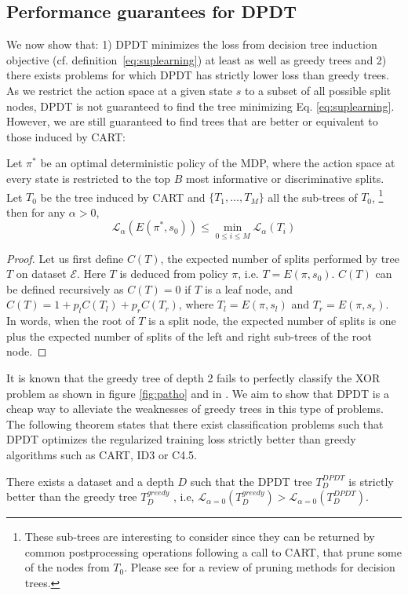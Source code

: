 \subsection{Performance guarantees for DPDT}
We now show that: 1) DPDT minimizes the loss from decision tree induction objective (cf. definition~\ref{eq:suplearning}) at least as well as greedy trees and 2) there exists problems for which DPDT has strictly lower loss than greedy trees. 
As we restrict the action space at a given state $s$ to a subset of all possible split nodes, DPDT is not guaranteed to find the tree minimizing Eq. \ref{eq:suplearning}. However, we are still guaranteed to find trees that are better or equivalent to those induced by CART:
\begin{theorem}\label{prop:cart}
Let $\pi^*$ be an optimal deterministic policy of the MDP, where the action space at every state is restricted to the top $B$ most informative or discriminative splits. 
Let $T_0$ be the tree induced by CART and $\{T_1,\dots,T_M\}$ all the sub-trees of $T_0$, \footnote{These sub-trees are interesting to consider since they can be returned by common postprocessing operations following a call to CART, that prune some of the nodes from $T_0$. Please see \cite{pruning1} for a review of pruning methods for decision trees.} then for any $\alpha > 0$, 
\[
{\mathcal L}_\alpha(E(\pi^*, s_0)) \leq \min_{0\leq i\leq M}{\mathcal L}_\alpha(T_i)
\]
\end{theorem}

\begin{proof}
Let us first define $C(T)$, the expected number of splits performed by tree $T$ on dataset $\mathcal E$. 
Here $T$ is deduced from policy $\pi$, i.e. $T=E(\pi, s_0)$. $C(T)$ can be defined recursively as $C(T) = 0$ if $T$ is a leaf node, and $C(T) = 1 + p_l C(T_l) + p_r  C(T_r)$, where $T_l = E(\pi, s_l)$ and $T_r = E(\pi, s_r)$. 
In words, when the root of $T$ is a split node, the expected number of splits is one plus the expected number of splits of the left and right sub-trees of the root node.
\end{proof}

It is known that the greedy tree of depth 2 fails to perfectly classify the XOR problem as shown in figure \ref{fig:patho} and in \cite{lookahead,how-eff}. We aim to show that DPDT is a cheap way to alleviate the weaknesses of greedy trees in this type of problems. The following theorem states that there exist classification problems such that DPDT optimizes the regularized training loss strictly better than greedy algorithms such as CART, ID3 or C4.5.
\begin{theorem}\label{thm:better_greedy}
There exists a dataset and a depth $D$ such that the DPDT tree $T^{DPDT}_D$ is strictly better than the greedy tree $T^{greedy}_{D}$ , i.e, $\mathcal{L}_{\alpha=0}(T^{greedy}_{D}) > \mathcal{L}_{\alpha=0}(T^{DPDT}_{D})$.
\end{theorem}

